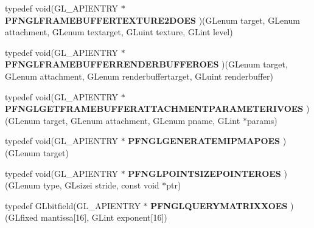 \begin{DoxyCompactItemize}
\item 
\hypertarget{class_c_p_v_r_tgles_ext_a7435dc747f0e8cabada663e2823b9b27}{typedef void(G\+L\+\_\+\+A\+P\+I\+E\+N\+T\+R\+Y $\ast$ {\bfseries P\+F\+N\+G\+L\+F\+R\+A\+M\+E\+B\+U\+F\+F\+E\+R\+T\+E\+X\+T\+U\+R\+E2\+D\+O\+E\+S} )(G\+Lenum target, G\+Lenum attachment, G\+Lenum textarget, G\+Luint texture, G\+Lint level)}\label{class_c_p_v_r_tgles_ext_a7435dc747f0e8cabada663e2823b9b27}

\item 
\hypertarget{class_c_p_v_r_tgles_ext_a39b58e338984f1350ef128eb6c4bc03c}{typedef void(G\+L\+\_\+\+A\+P\+I\+E\+N\+T\+R\+Y $\ast$ {\bfseries P\+F\+N\+G\+L\+F\+R\+A\+M\+E\+B\+U\+F\+F\+E\+R\+R\+E\+N\+D\+E\+R\+B\+U\+F\+F\+E\+R\+O\+E\+S} )(G\+Lenum target, G\+Lenum attachment, G\+Lenum renderbuffertarget, G\+Luint renderbuffer)}\label{class_c_p_v_r_tgles_ext_a39b58e338984f1350ef128eb6c4bc03c}

\item 
\hypertarget{class_c_p_v_r_tgles_ext_a003746265e611d2c52929275d967e194}{typedef void(G\+L\+\_\+\+A\+P\+I\+E\+N\+T\+R\+Y $\ast$ {\bfseries P\+F\+N\+G\+L\+G\+E\+T\+F\+R\+A\+M\+E\+B\+U\+F\+F\+E\+R\+A\+T\+T\+A\+C\+H\+M\+E\+N\+T\+P\+A\+R\+A\+M\+E\+T\+E\+R\+I\+V\+O\+E\+S} )(G\+Lenum target, G\+Lenum attachment, G\+Lenum pname, G\+Lint $\ast$params)}\label{class_c_p_v_r_tgles_ext_a003746265e611d2c52929275d967e194}

\item 
\hypertarget{class_c_p_v_r_tgles_ext_a94bc72f6a6ec93897a489a4b43d79756}{typedef void(G\+L\+\_\+\+A\+P\+I\+E\+N\+T\+R\+Y $\ast$ {\bfseries P\+F\+N\+G\+L\+G\+E\+N\+E\+R\+A\+T\+E\+M\+I\+P\+M\+A\+P\+O\+E\+S} )(G\+Lenum target)}\label{class_c_p_v_r_tgles_ext_a94bc72f6a6ec93897a489a4b43d79756}

\item 
\hypertarget{class_c_p_v_r_tgles_ext_a1330d137d822f936951d5e663f734e81}{typedef void(G\+L\+\_\+\+A\+P\+I\+E\+N\+T\+R\+Y $\ast$ {\bfseries P\+F\+N\+G\+L\+P\+O\+I\+N\+T\+S\+I\+Z\+E\+P\+O\+I\+N\+T\+E\+R\+O\+E\+S} )(G\+Lenum type, G\+Lsizei stride, const void $\ast$ptr)}\label{class_c_p_v_r_tgles_ext_a1330d137d822f936951d5e663f734e81}

\item 
\hypertarget{class_c_p_v_r_tgles_ext_a3f06bc9368060806ce948fcd02c4db38}{typedef G\+Lbitfield(G\+L\+\_\+\+A\+P\+I\+E\+N\+T\+R\+Y $\ast$ {\bfseries P\+F\+N\+G\+L\+Q\+U\+E\+R\+Y\+M\+A\+T\+R\+I\+X\+X\+O\+E\+S} )(G\+Lfixed mantissa\mbox{[}16\mbox{]}, G\+Lint exponent\mbox{[}16\mbox{]})}\label{class_c_p_v_r_tgles_ext_a3f06bc9368060806ce948fcd02c4db38}


\end{DoxyCompactItemize}
